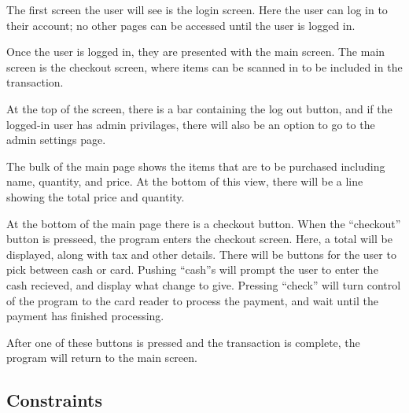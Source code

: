 
The first screen the user will see is the login screen. Here the user can log in to their
account; no other pages can be accessed until the user is logged in.\par
Once the user is logged in, they are presented with the main screen. The main screen is the checkout
screen, where items can be scanned in to be included in the transaction.\par
At the top of the screen, there is a bar containing the log out button, and 
if the logged-in user has admin privilages, there will also be an option to
go to the admin settings page.\par
The bulk of the main page shows the items that are to be purchased including name, quantity,
and price. At the bottom of this view, there will be a line showing the total price and quantity.\par
At the bottom of the main page there is a checkout button.
When the ``checkout'' button is presseed, the program enters the checkout screen. Here, a total
will be displayed, along with tax and other details. There will be buttons for the user to pick between cash or card.
Pushing ``cash''s will prompt the user to enter the cash recieved, and display what
change to give. Pressing ``check'' will turn control of the program to the card reader
to process the payment, and wait until the payment has finished processing.\par
After one of these buttons is pressed and the transaction is complete, the program will return to the
main screen.

\subsection{Constraints}


